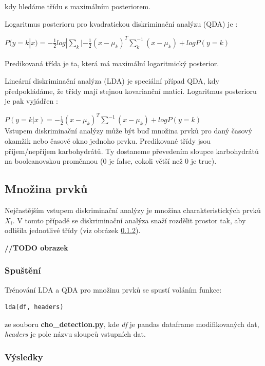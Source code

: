 \\\\
kdy hledáme třídu s maximálním posteriorem.

Logaritmus posterioru pro kvadratickou diskriminační analýzu (QDA) je \citep{cho.book.lda}:

$P(y=k|x)=-\frac{1}{2}log|\sum_{k}|-\frac{1}{2}(x-\mu_{k})^{T}\sum^{-1}_{k}(x-\mu_{k})+logP(y=k)$\\\\
Predikovaná třída je ta, která má maximální logaritmický posterior.

Lineární diskriminační analýza (LDA) je speciální případ QDA, kdy předpokládáme, že třídy mají stejnou kovarianční matici. Logaritmus posterioru je pak vyjádřen \citep{cho.scikit.lda}:

$P(y=k|x)=-\frac{1}{2}(x-\mu_{k})^{T}\sum^{-1}(x-\mu_{k})+logP(y=k)$\\

Vstupem diskriminační analýzy může být buď množina prvků pro daný časový okamžik nebo časové okno jednoho prvku. Predikované třídy jsou příjem/nepříjem karbohydrátů. Ty dostaneme převedením sloupce karbohydrátů na booleanovskou proměnnou (0 je false, cokoli větší než 0 je true).

\subsection{Množina prvků}

Nejčastějším vstupem diskriminační analýzy je množina charakteristických prvků $X_{i}$. V tomto případě se diskriminační analýza snaží rozdělit prostor tak, aby odlišila jednotlivé třídy (viz obrázek \ref{}).

\textbf{//TODO obrazek}

\subsubsection{Spuštění}

Trénování LDA a QDA pro množinu prvků se spustí voláním funkce:
\begin{verbatim}
lda(df, headers)
\end{verbatim}
ze souboru \textbf{cho\_detection.py}, kde \textit{df} je pandas dataframe modifikovaných dat, \textit{headers} je pole názvu sloupců vstupních dat.

\subsubsection{Výsledky}


